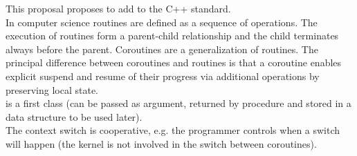 
This proposal proposes to add \coro to the C++ standard.\\
\newline
In computer science routines are defined as a sequence of operations. The
execution of routines form a parent-child relationship and the child terminates
always before the parent. Coroutines are a generalization of routines. The
principal difference between coroutines and routines is that a coroutine enables
explicit suspend and resume of their progress via additional operations by
preserving local state.\\
\newline
\coro is a first class \continuation (can be passed as argument, returned
by procedure and stored in a data structure to be used later).\\
The context switch is cooperative, e.g. the programmer controls when a switch
will happen (the kernel is not involved in the switch between coroutines).\\
\newline
{}
